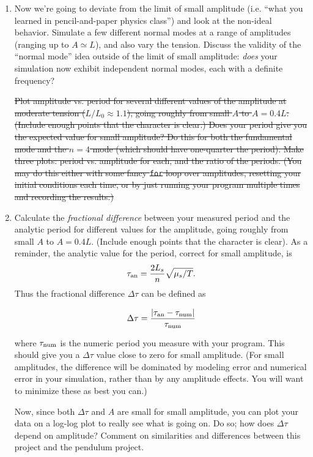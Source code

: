 \documentclass[12pt]{article}
\begin{document}
\begin{enumerate}
{\it Note: This part may be modified in the next few weeks.}

\item{Now we're going to deviate from the limit of small amplitude (i.e. ``what you learned in pencil-and-paper physics class'') and look at the non-ideal behavior. Simulate a few different normal modes at a range of amplitudes (ranging up to $A \simeq L$), and also vary the tension.
Discuss the validity of the ``normal mode'' idea outside of the limit of small amplitude: {\it does} your simulation now exhibit independent normal modes, each with a definite frequency?}



\st{Plot amplitude vs. period for several different values of the amplitude at moderate tension ($L/L_0 \approx 1.1$), going roughly from small $A$ to $A=0.4L$. (Include enough points that the character is clear.) Does your period give you the expected value for small amplitude?
Do this for both the fundamental mode and the $n=4$ mode (which should have one-quarter the period). Make three plots: period vs. 
amplitude for each, and the ratio of the periods. (You may do this either with some fancy {\tt for} loop over amplitudes, resetting your initial conditions each time, or by just running your program multiple times and recording the results.)}

\item{Calculate the {\it fractional difference} between your measured period and the analytic period for different values for the amplitude, going roughly from small $A$ to $A=0.4L$. (Include enough points that the character is clear). As a reminder, the analytic value
for the period, correct for small amplitude, is $$\tau_{\rm {an}}=\frac{2L_s}{n} \sqrt{\mu_s/T}.$$ Thus the fractional difference $\Delta \tau$ can be defined as

$$\Delta \tau = \frac{\left |\tau_{\rm an} - \tau_{\rm num}\right|}{\tau_{\rm num}}$$

where $\tau_{\rm num}$ is the numeric period you measure with your program. This should give you a $\Delta \tau$ value close to zero for small amplitude. (For small amplitudes, the difference will be dominated by modeling error and numerical error in your 
simulation, rather than by any amplitude effects. You will want to minimize these as best you can.) 

Now, since both $\Delta \tau$ and $A$ are small for small amplitude, you can plot your data on a log-log plot to really see what is going on. Do so; how does $\Delta \tau$ depend on amplitude? 
Comment on similarities and differences between this project and the pendulum project.

}
\end{enumerate}
\end{document}
